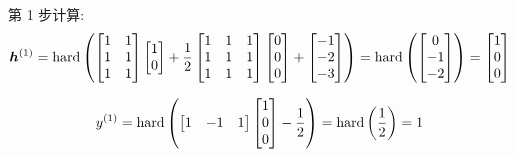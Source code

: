 \documentclass{article}
\begin{document}
第 1 步计算:
\begin{equation}
  \bm{h}^{(1)}
  =\operatorname{hard}\left(
    \begin{bmatrix}
      1 & 1 \\
      1 & 1 \\
      1 & 1 \\
    \end{bmatrix}
    \begin{bmatrix}
      1 \\ 0 \\
    \end{bmatrix}
    +\frac{1}{2}
    \begin{bmatrix}
      1 & 1 & 1 \\
      1 & 1 & 1 \\
      1 & 1 & 1 \\
    \end{bmatrix}
    \begin{bmatrix}
      0 \\ 0 \\ 0 \\
    \end{bmatrix}
    +
    \begin{bmatrix}
      -1 \\ -2 \\ -3 \\
    \end{bmatrix}
  \right)
  =\operatorname{hard}\left(
    \begin{bmatrix}
      0 \\ -1 \\ -2 \\
    \end{bmatrix}
  \right)
  =
  \begin{bmatrix}
    1 \\ 0 \\ 0 \\
  \end{bmatrix}
\end{equation}

\begin{equation}
  y^{(1)}
  =\operatorname{hard}\left(
    \begin{bmatrix}
      1 & -1 & 1 \\
    \end{bmatrix}
    \begin{bmatrix}
      1 \\ 0 \\ 0 \\
    \end{bmatrix}
    -\frac{1}{2}
  \right)
  =\operatorname{hard}\left(
    \frac{1}{2}
  \right)
  =1
\end{equation}
\end{document}
